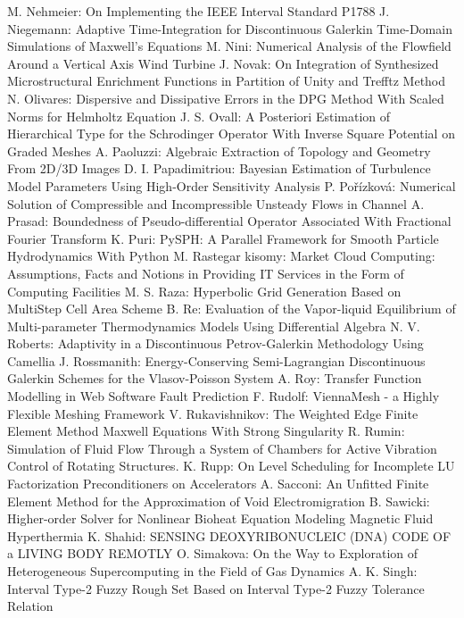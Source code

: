 \documentclass[10pt, A4]{article}%
\begin{document}
{M. Nehmeier}: {On Implementing  the IEEE Interval Standard P1788}
{J. Niegemann}: {Adaptive Time-Integration for Discontinuous Galerkin Time-Domain Simulations of Maxwell's Equations}
{M. Nini}: {Numerical Analysis of the Flowfield Around a Vertical Axis Wind Turbine}
{J. Novak}: {On Integration of Synthesized Microstructural Enrichment Functions in Partition of Unity and Trefftz Method}
{N. Olivares}: {Dispersive and Dissipative Errors in the DPG Method With Scaled Norms for Helmholtz Equation}
{J. S. Ovall}: {A Posteriori Estimation of Hierarchical Type for the  Schrodinger Operator With Inverse Square Potential on Graded Meshes}
{A. Paoluzzi}: {Algebraic Extraction of Topology and Geometry From 2D/3D Images}
{D. I. Papadimitriou}: {Bayesian Estimation of Turbulence Model Parameters Using High-Order Sensitivity Analysis}
{P. Pořízková}: {Numerical Solution of Compressible and Incompressible Unsteady Flows in Channel}
{A. Prasad}: {Boundedness of Pseudo-differential Operator Associated With Fractional Fourier Transform}
{K. Puri}: {PySPH: A Parallel Framework for Smooth Particle Hydrodynamics With Python}
{M. Rastegar kisomy}: {Market Cloud Computing: Assumptions, Facts and Notions in Providing IT Services in the Form of Computing Facilities}
{M. S. Raza}: {Hyperbolic Grid Generation Based on MultiStep Cell Area Scheme}
{B. Re}: {Evaluation of the Vapor-liquid Equilibrium of Multi-parameter Thermodynamics Models Using Differential Algebra}
{N. V. Roberts}: {Adaptivity in a Discontinuous Petrov-Galerkin Methodology Using Camellia}
{J. Rossmanith}: {Energy-Conserving Semi-Lagrangian Discontinuous Galerkin Schemes for the Vlasov-Poisson System}
{A. Roy}: {Transfer Function Modelling in Web Software Fault Prediction}
{F. Rudolf}: {ViennaMesh - a Highly Flexible Meshing Framework}
{V. Rukavishnikov}: {The Weighted Edge Finite Element Method Maxwell Equations With Strong Singularity}
{R. Rumin}: {Simulation of Fluid Flow Through a System of Chambers for Active Vibration Control of Rotating Structures.}
{K. Rupp}: {On Level Scheduling for Incomplete LU Factorization Preconditioners on Accelerators}
{A. Sacconi}: {An Unfitted Finite Element Method for the Approximation of Void Electromigration}
{B. Sawicki}: {Higher-order Solver for Nonlinear Bioheat Equation Modeling Magnetic Fluid Hyperthermia}
{K. Shahid}: {SENSING DEOXYRIBONUCLEIC (DNA) CODE OF a LIVING BODY REMOTLY}
{O. Simakova}: {On the Way to Exploration of Heterogeneous Supercomputing in the Field of Gas Dynamics}
{A. K. Singh}: {Interval Type-2 Fuzzy Rough Set Based on Interval Type-2 Fuzzy Tolerance Relation}
\end{document}
